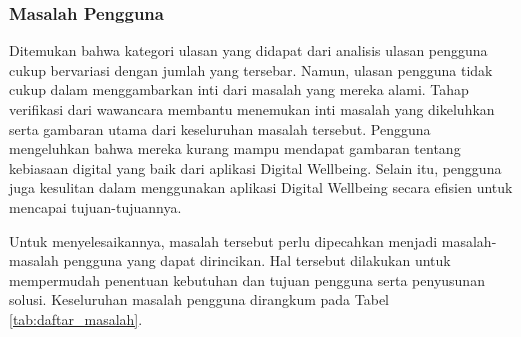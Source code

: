 \subsubsection{Masalah Pengguna}
\label{subsubsec:masalah_pengguna}

Ditemukan bahwa kategori ulasan yang didapat dari analisis ulasan pengguna cukup bervariasi dengan jumlah yang tersebar. Namun, ulasan pengguna tidak cukup dalam menggambarkan inti dari masalah yang mereka alami. Tahap verifikasi dari wawancara membantu menemukan inti masalah yang dikeluhkan serta gambaran utama dari keseluruhan masalah tersebut. Pengguna mengeluhkan bahwa mereka kurang mampu mendapat gambaran tentang kebiasaan digital yang baik dari aplikasi Digital Wellbeing. Selain itu, pengguna juga kesulitan dalam menggunakan aplikasi Digital Wellbeing secara efisien untuk mencapai tujuan-tujuannya.

Untuk menyelesaikannya, masalah tersebut perlu dipecahkan menjadi masalah-masalah pengguna yang dapat dirincikan. Hal tersebut dilakukan untuk mempermudah penentuan kebutuhan dan tujuan pengguna serta penyusunan solusi. Keseluruhan masalah pengguna dirangkum pada Tabel \ref{tab:daftar_masalah}.

